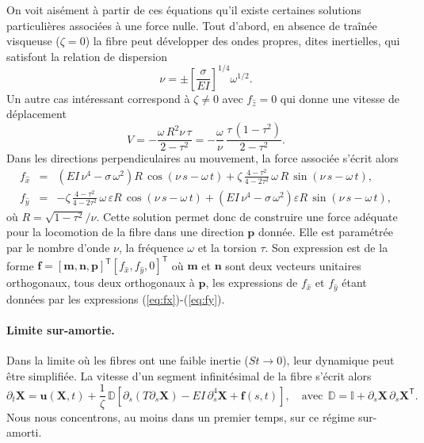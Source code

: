 \documentclass[a4paper,11pt]{article}
\begin{document}
On voit aisément à partir de ces équations qu'il existe certaines solutions particulières associées à une force nulle.  Tout d'abord, en absence de traînée visqueuse ($\zeta=0$)  la fibre peut développer des ondes propres, dites inertielles, qui satisfont la relation de dispersion
\begin{equation}
  \nu = \pm\left[\frac{\sigma}{EI}\right]^{1/4}\omega^{1/2}.
\end{equation}
Un autre cas intéressant correspond à $\zeta\neq0$ avec $f_{\hat{z}} = 0$ qui donne une vitesse de déplacement
\begin{equation}
  V = -\frac{\omega\,R^2\nu\,\tau}{2-\tau^2} = -\frac{\omega}{\nu} \, \frac{\tau\,(1-\tau^2)}{2-\tau^2}.
\end{equation}
Dans les directions perpendiculaires au mouvement, la force associée s'écrit alors
\begin{eqnarray}
  f_{\hat{x}} &=& \left(EI\,\nu^4-\sigma\,\omega^2\right) R\,\cos(\nu\,s-\omega\,t) + \zeta\, \frac{4-\tau^2}{4-2\tau^2}\,\omega\,R\,\sin(\nu\,s-\omega\,t), \label{eq:fx}\\
  f_{\hat{y}}&=& -\zeta\, \frac{4-\tau^2}{4-2\tau^2}\,\omega\,\varepsilon R\, \cos(\nu\,s-\omega\,t)+\left(EI\,\nu^4-\sigma\,\omega^2\right) \varepsilon R\,\sin(\nu\,s-\omega\,t), \label{eq:fy}
\end{eqnarray}
où $R = \sqrt{1-\tau^2}/\nu$. Cette solution permet donc de construire une force adéquate pour la locomotion de la fibre dans une direction $\bm p$ donnée. Elle est paramétrée par le nombre d'onde $\nu$, la fréquence $\omega$ et la torsion $\tau$. Son expression est de la forme $\bm f = [\bm m,\bm n,\bm p]^{\mathsf{T}} [f_{\hat{x}}, f_{\hat{y}},0]^{\mathsf{T}}$ où  $\bm m$ et $\bm n$ sont deux vecteurs unitaires orthogonaux, tous deux orthogonaux à $\bm p$, les expressions de $f_{\hat{x}}$ et $f_{\hat{y}}$ étant données par les expressions (\ref{eq:fx})-(\ref{eq:fy}).

\paragraph{Limite sur-amortie.} Dans la limite où les fibres ont une faible inertie ($St\to0$), leur dynamique peut être simplifiée. La vitesse d'un segment infinitésimal de la fibre s'écrit alors
\begin{equation}
  \partial_t \bm X = \bm u(\bm X,t) +\frac{1}{\zeta}\,\mathbb{D}\left[ \partial_s(T\partial_s \bm X) - EI\,\partial_s^4 \bm X + \bm f(s,t) \right]\!,\quad\mbox{avec}\ \ \mathbb{D} = \mathbb{I} + \partial_s\bm X\,\partial_s\bm X^{\mathsf{T}}.
  \label{eq:vel_fib}
\end{equation}
Nous nous concentrons, au moins dans un premier temps, sur ce régime sur-amorti. 



\end{document}

